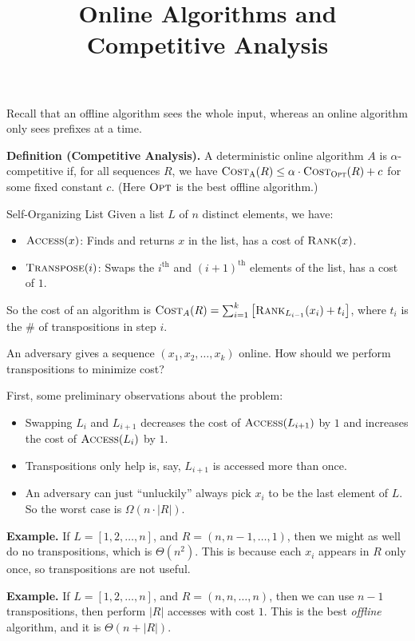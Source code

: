 \title{Online Algorithms and Competitive Analysis}



Recall that an offline algorithm sees the whole input, whereas an online algorithm only sees prefixes at a time.

\textbf{Definition (Competitive Analysis).} A deterministic online algorithm $A$ is $\alpha$-competitive if, for all sequences $R$, we have $\textsc{Cost}_{\textsc{A}}(R) \leq \alpha \cdot \textsc{Cost}_{\textsc{Opt}}(R) + c$ for some fixed constant $c$.  (Here $\textsc{Opt}$ is the best offline algorithm.)

\begin{problem}{Self-Organizing List}
    Given a list $L$ of $n$ distinct elements, we have:
    \begin{itemize}
        \item $\textsc{Access}(x)$: Finds and returns $x$ in the list, has a cost of $\textsc{Rank}(x)$.
        \item $\textsc{Transpose}(i)$: Swaps the $i^{\text{th}}$ and $(i + 1)^{\text{th}}$ elements of the list, has a cost of $1$.
    \end{itemize}
    So the cost of an algorithm is $\textsc{Cost}_A(R) = \sum_{i = 1}^k \left [ \textsc{Rank}_{L_{i - 1}}(x_i) + t_i \right ]$, where $t_i$ is the \# of transpositions in step $i$.

    An adversary gives a sequence $(x_1, x_2, \dots, x_k)$ online.  How should we perform transpositions to minimize cost?
\end{problem}

First, some preliminary observations about the problem:
\begin{itemize}
    \item Swapping $L_i$ and $L_{i + 1}$ decreases the cost of $\textsc{Access}(L_{i + 1})$ by $1$ and increases the cost of $\textsc{Access}(L_i)$ by $1$.
    \item Transpositions only help is, say, $L_{i + 1}$ is accessed more than once.
    \item An adversary can just ``unluckily'' always pick $x_i$ to be the last element of $L$.  So the worst case is $\Omega(n \cdot |R|)$.
\end{itemize}
\textbf{Example.} If $L = [1, 2, \dots, n]$, and $R = (n, n - 1, \dots, 1)$, then we might as well do no transpositions, which is $\Theta(n^2)$.  This is because each $x_i$ appears in $R$ only once, so transpositions are not useful.

\textbf{Example.} If $L = [1, 2, \dots, n]$, and $R = (n, n, \dots, n)$, then we can use $n - 1$ transpositions,  then perform $|R|$ accesses with cost $1$.  This is the best \emph{offline} algorithm, and it is $\Theta(n + |R|)$.

